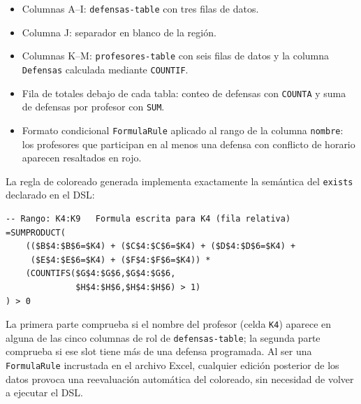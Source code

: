 \documentclass[12pt,a4paper]{report}
\begin{document}
\begin{itemize}
  \item Columnas A--I: \texttt{defensas-table} con tres filas de datos.
  \item Columna J: separador en blanco de la regi\'on.
  \item Columnas K--M: \texttt{profesores-table} con seis filas de datos
    y la columna \texttt{Defensas} calculada mediante \texttt{COUNTIF}.
  \item Fila de totales debajo de cada tabla: conteo de defensas con
    \texttt{COUNTA} y suma de defensas por profesor con \texttt{SUM}.
  \item Formato condicional \texttt{FormulaRule} aplicado al rango de la
    columna \texttt{nombre}: los profesores que participan en al menos una
    defensa con conflicto de horario aparecen resaltados en rojo.
\end{itemize}

La regla de coloreado generada implementa exactamente la sem\'antica del
\texttt{exists} declarado en el DSL:

\begin{lstlisting}[style=pythonstyle,
  caption={FormulaRule SUMPRODUCT+COUNTIFS incrustada en el .xlsx.}]
-- Rango: K4:K9   Formula escrita para K4 (fila relativa)
=SUMPRODUCT(
    (($B$4:$B$6=$K4) + ($C$4:$C$6=$K4) + ($D$4:$D$6=$K4) +
     ($E$4:$E$6=$K4) + ($F$4:$F$6=$K4)) *
    (COUNTIFS($G$4:$G$6,$G$4:$G$6,
              $H$4:$H$6,$H$4:$H$6) > 1)
) > 0
\end{lstlisting}

La primera parte comprueba si el nombre del profesor (celda \texttt{K4})
aparece en alguna de las cinco columnas de rol de \texttt{defensas-table};
la segunda parte comprueba si ese slot tiene m\'as de una defensa
programada.  Al ser una \texttt{FormulaRule} incrustada en el archivo Excel,
cualquier edici\'on posterior de los datos provoca una reevaluaci\'on
autom\'atica del coloreado, sin necesidad de volver a ejecutar el DSL.
\end{document}
